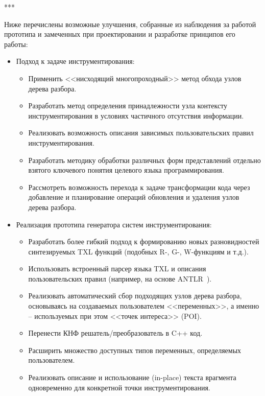 ***

Ниже перечислены возможные улучшения, собранные из наблюдения за работой прототипа и замеченных при проектировании и разработке принципов его работы:

\begin{itemize}[noitemsep]
  \item Подход к задаче инструментирования:
    \begin{itemize}[noitemsep]
        \item Применить <<нисходящий многопроходный>> метод обхода узлов дерева разбора.
        \item Разработать метод определения принадлежности узла контексту инструментирования в условиях частичного отсутствия информации.
        \item Реализовать возможность описания зависимых пользовательских правил инструментирования.
        \item Разработать методику обработки различных форм представлений отдельно взятого ключевого понятия целевого языка программирования.
        \item Рассмотреть возможность перехода к задаче трансформации кода через добавление и планирование операций обновления и удаления узлов дерева разбора.
    \end{itemize}

  \item Реализация прототипа генератора систем инструментирования:
    \begin{itemize}[noitemsep]
      \item Разработать более гибкий подход к формированию новых разновидностей синтезируемых TXL функций (подобных R-, G-, W-функциям и т.д.).
      \item Использовать встроенный парсер языка TXL и описания пользовательских правил (например, на основе ANTLR~\cite{antlr}).
      \item Реализовать автоматический сбор подходящих узлов дерева разбора, основываясь на создаваемых пользователем <<переменных>>, а именно -- используемых при этом <<точек интереса>> (POI).
      \item Перенести КНФ решатель/преобразователь в C++ код.
      \item Расширить множество доступных типов переменных, определяемых пользователем.
      \item Реализовать описание и использование (in-place) текста врагмента одновременно для конкретной точки инструментирования.
    \end{itemize}
\end{itemize}

